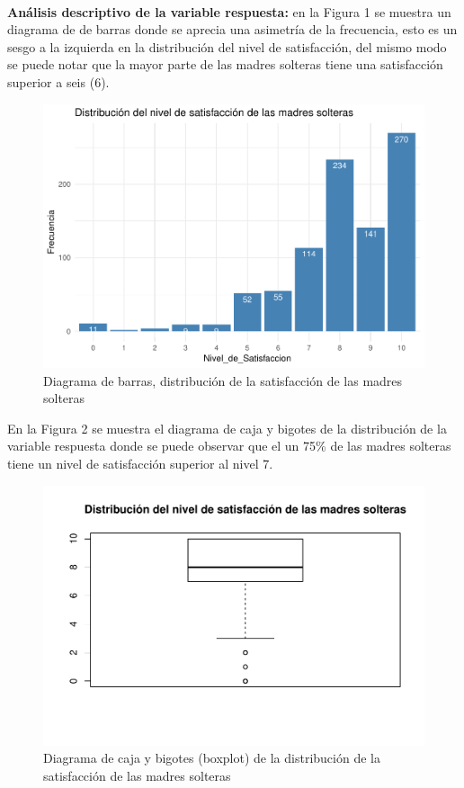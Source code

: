\documentclass[11pt,twoside]{article}
\begin{document}
\\
\textbf{Análisis descriptivo de la variable respuesta:} en la Figura 1 se muestra un diagrama de de barras donde se aprecia una asimetría de la frecuencia, esto es un sesgo a la izquierda en la distribución del nivel de satisfacción, del mismo modo se puede notar que la mayor parte de las madres solteras tiene una satisfacción superior a seis (6). 
\\
\begin{figure}[H]
	\centering
	\includegraphics{barras2.pdf}
	\caption{Diagrama de barras, distribución de la satisfacción de las madres solteras}
\end{figure}


\noindent
En la Figura 2 se muestra el diagrama de caja y bigotes de la distribución de la variable respuesta donde se puede observar que el un 75{\%} de las madres solteras tiene un nivel de satisfacción superior al nivel 7. 

\begin{figure}[H]
	\centering
	\includegraphics{boxplot1.pdf}
	\caption{Diagrama de caja y bigotes (boxplot) de la distribución de la satisfacción de las madres solteras}
\end{figure}
\end{document}
